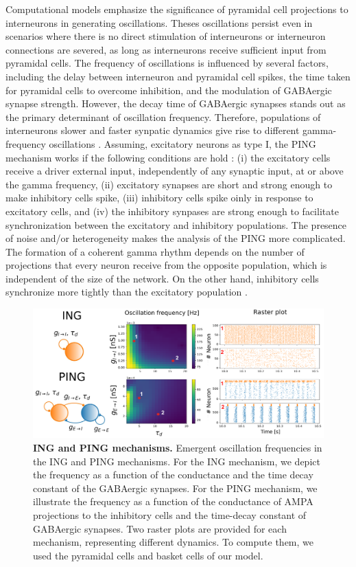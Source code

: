 \documentclass[../main.tex]{subfiles}
\begin{document}
Computational models emphasize the significance of pyramidal cell projections to interneurons in generating oscillations.
Theses oscillations persist even in scenarios where there is no direct stimulation of interneurons or interneuron connections are severed, as long as interneurons receive sufficient input from pyramidal cells.
The frequency of oscillations is influenced by several factors, including the delay between interneuron and pyramidal cell spikes, the time taken for pyramidal cells to overcome inhibition, and the modulation of GABAergic synapse strength.
However, the decay time of GABAergic synapses stands out as the primary determinant of oscillation frequency.
Therefore, populations of interneurons slower and faster synpatic dynamics give rise to different gamma-frequency oscillations \citep{Tort2007}.
Assuming, excitatory neurons as type I, the PING mechanism works if the following conditions are hold \citep{cutsuridis_hippocampal_2018}:
(i) the excitatory cells receive a driver external input, independently of any synaptic input, at or above the gamma frequency, (ii) excitatory synapses are short and strong enough to make inhibitory cells spike, (iii) inhibitory cells spike oinly in response to excitatory cells, and (iv) the inhibitory synpases are strong enough to  facilitate synchronization between the excitatory and inhibitory populations.
The presence of noise and/or heterogeneity makes the analysis of the PING more complicated.
The formation of a coherent gamma rhythm depends on the number of projections that every neuron receive from the opposite population, which is independent of the size of the network.
On the other hand, inhibitory cells synchronize more tightly than the excitatory population \citep{cutsuridis_hippocampal_2018,Wang1996,kopell2002mechanisms}.
\clearpage
\begin{figure}[!htb]
    \centering
    \includegraphics[width=\textwidth]{chapter4/figures/PING_and_ING.png}
    \caption{\textbf{ING and PING mechanisms.}
    Emergent oscillation frequencies in the ING and PING mechanisms.
    For the ING mechanism, we depict the frequency as a function of the conductance and the time decay constant of the GABAergic synapses.
    For the PING mechanism, we illustrate the frequency as a function of the conductance of AMPA projections to the inhibitory cells and the time-decay constant of GABAergic synapses.
    Two raster plots are provided for each mechanism, representing different dynamics.
    To compute them, we used the pyramidal cells and basket cells of our model.}
    \label{fig:PING-mechanim}
\end{figure}
\end{document}
